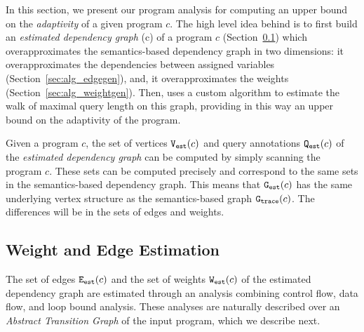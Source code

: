 In this section, we present our program analysis {\THESYSTEM} for
computing an upper bound on the \emph{adaptivity} of a given program
$c$.  The high level idea behind {\THESYSTEM} is to first build
an \emph{estimated dependency graph} \progG(c) of a program $c$
(Section~\ref{sec:alg_weightedgegen}) which overapproximates the
semantics-based dependency graph in two dimensions: it
overapproximates the dependencies between assigned variables (Section~\ref{sec:alg_edgegen}), and, it
overapproximates the weights (Section~\ref{sec:alg_weightgen}). Then, {\THESYSTEM} uses a custom algorithm to estimate the 
walk of maximal query length on this graph, providing in this way an upper bound on the adaptivity of the
program.


%
%
Given a program $c$, the set of vertices $\mathtt{{V_{est}}}(c)$ and query annotations $\mathtt{{Q_{est}}}(c)$ of the \emph{estimated dependency graph} can be computed by simply
scanning the program $c$. These sets can be computed precisely and correspond to
the same sets in the semantics-based dependency graph.
This means that $\mathtt{{G_{est}}}(c)$ has the same underlying vertex structure as 
the semantics-based graph $\mathtt{{G_{trace}}}(c)$. The differences will be in the sets of edges and weights. 



\subsection{Weight and Edge Estimation}
\label{sec:alg_weightedgegen}
The set of edges $\mathtt{{E_{est}}}(c)$ and the set of weights $\mathtt{{W_{est}}}(c)$ of the estimated dependency graph are estimated through an analysis combining control flow, data flow, and loop bound analysis. These analyses are naturally described over an  \emph{Abstract Transition Graph} of the input program, which we describe next.
%
%
